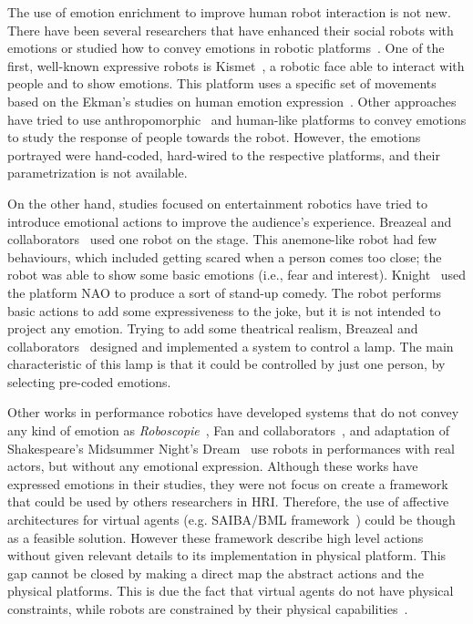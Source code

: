 The use of emotion enrichment to improve human robot interaction is not new. There have been several researchers that have enhanced their social robots with emotions or studied how to convey emotions in robotic platforms~\cite{Li2011,Brown2014}. One of the first, well-known expressive robots is Kismet~\cite{Breazeal2002}, a robotic face able to interact with people and to show emotions. This platform uses a specific set of movements based on the Ekman's studies on human emotion expression~\cite{Ekman2004}. Other approaches have tried to use anthropomorphic~\cite{Arras2012} and human-like platforms to convey emotions to study the response of people towards the robot. However, the emotions portrayed were hand-coded, hard-wired to the respective platforms, and their parametrization is not available.

On the other hand, studies focused on entertainment robotics have tried to introduce emotional actions to improve the audience's experience. Breazeal and collaborators~\cite{Breazeal2003} used one robot on the stage. This anemone-like robot had few behaviours, which included getting scared when a person comes too close; the robot was able to show some basic emotions (i.e., fear and interest). Knight~\cite{Knight2011b} used the platform NAO to produce a sort of stand-up comedy. The robot performs basic actions to add some expressiveness to the joke, but it is not intended to project any emotion. Trying to add some theatrical realism, Breazeal and collaborators~\cite{Breazeal2008} designed and implemented a system to control a lamp. The main characteristic of this lamp is that it could be controlled by just one person, by selecting pre-coded emotions.

Other works in performance robotics have developed systems that do not convey any kind of emotion as \textit{Roboscopie}~\cite{Roboscopie2012}, Fan and collaborators~\cite{Fan2009}, and adaptation of Shakespeare's  Midsummer Night's Dream~\cite{murphy2011} use robots in performances with real actors, but without any emotional expression. Although these works have expressed emotions in their studies, they were not focus on create a framework that could be used by others researchers in HRI. Therefore, the use of affective architectures for virtual agents (e.g. SAIBA/BML framework~\cite{Kopp2006}) could be though as a feasible solution. However these framework describe high level actions without given relevant details to its implementation in physical platform. This gap cannot be closed by making a direct map the abstract actions and the physical platforms. This is due the fact that virtual agents do not have physical constraints, while robots are constrained by their physical capabilities~\cite{Saerbeck2007,Canamero2010}. 
